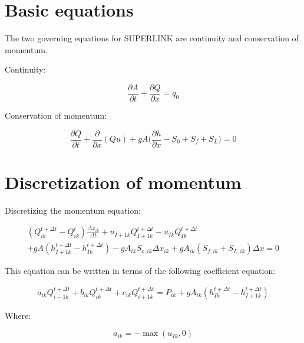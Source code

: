 \documentclass[11pt]{article}
\begin{document}
\section{Basic equations}

The two governing equations for SUPERLINK are continuity and conservation of momentum.

Continuity:

\begin{equation}
  \frac{\partial A}{\partial t} + \frac{\partial Q}{\partial x} = q_0
\end{equation}

Conservation of momentum:

\begin{equation}
  \frac{\partial Q}{\partial t} + \frac{\partial}{\partial x} (Q u) + g A \biggl(\frac{\partial h}{\partial x} - S_0 + S_f + S_L \biggr) = 0
\end{equation}

\section{Discretization of momentum}

Discretizing the momentum equation:

\begin{equation}
  \begin{split}
    (Q_{ik}^{t + \Delta t} - Q_{ik}^t) \frac{\Delta x_{ik}}{\Delta t} + u_{I+1k}
    Q_{I + 1k}^{t + \Delta t} - u_{Ik} Q_{Ik}^{t + \Delta t} \\
    + g A (h_{I+1k}^{t + \Delta t} - h_{Ik}^{t + \Delta t}) 
    - g A_{ik} S_{o,ik} \Delta x_{ik} + g
    A_{ik} (S_{f,ik} + S_{L,ik}) \Delta x = 0
  \end{split}
\end{equation}

This equation can be written in terms of the following coefficient equation:

\begin{equation}
  \begin{split}
    a_{ik} Q_{i - 1k}^{t + \Delta t} + b_{ik} Q_{ik}^{t + \Delta t} + c_{ik} Q_{i + 1k}^{t + \Delta t} =
    P_{ik} + g A_{ik} (h_{Ik}^{t + \Delta t} - h_{I+1k}^{t + \Delta t})
  \end{split}
\end{equation}

Where:

\begin{equation}
  a_{ik} = - \max(u_{Ik}, 0)
\end{equation}
\end{document}
